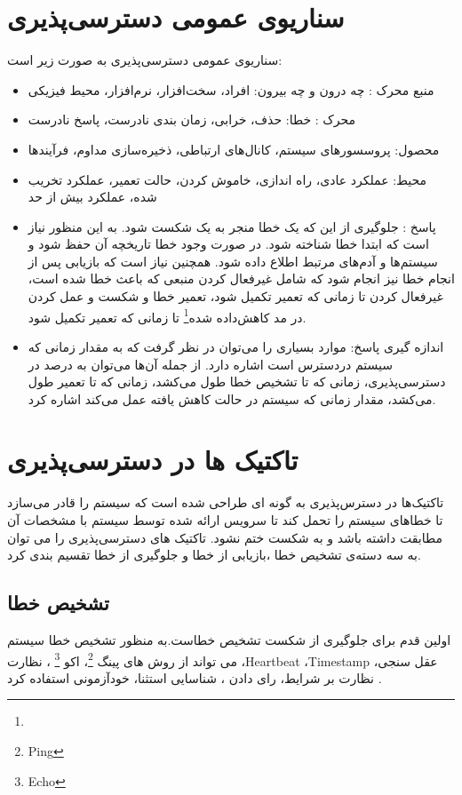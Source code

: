 \section{سناریوی عمومی دسترسی‌پذیری}
سناریو‌ی عمومی دسترسی‌پذیری به صورت زیر است:
\begin{itemize}
\item
منبع محرک : چه درون و چه بیرون: افراد، سخت‌افزار، نرم‌افزار، محیط فیزیکی 
\item
محرک : خطا: حذف، خرابی، زمان بندی نادرست، پاسخ نادرست
\item
محصول: پروسسورهای سیستم، کانال‌های ارتباطی، ذخیره‌سازی مداوم، فرآیند‌ها
\item
محیط: عملکرد عادی، راه اندازی، خاموش کردن، حالت تعمیر، عملکرد تخریب شده، عملکرد بیش از حد
\item
پاسخ : جلوگیری از این که یک خطا منجر به یک شکست شود. به این منظور نیاز است که ابتدا خطا شناخته شود. در صورت وجود خطا تاریخچه آن حفظ شود و سیستم‌ها و آدم‌های مرتبط اطلاع داده شود. همچنین نیاز است که بازیابی پس از انجام خطا نیز انجام شود که شامل غیرفعال کردن منبعی که باعث خطا شده است، غیرفعال کردن تا زمانی که تعمیر تکمیل شود، تعمیر خطا و شکست و عمل کردن در مد کاهش‌داده شده\footnote{} تا زمانی که تعمیر تکمیل شود.
\item
اندازه گیری پاسخ: موارد بسیاری را می‌توان در نظر گرفت که به مقدار زمانی که سیستم دردسترس است اشاره دارد. از جمله آن‌ها می‌توان به درصد در دسترسی‌پذیری، زمانی که تا تشخیص خطا طول می‌کشد، زمانی که تا تعمیر طول ‌می‌کشد، مقدار زمانی که سیستم در حالت کاهش یافته عمل می‌کند اشاره کرد. 
\end{itemize}

\section{تاکتیک ها در دسترسی‌پذیری}
تاکتیک‌ها در دسترس‌پذیری به گونه ای طراحی شده است که سیستم را قادر می‌سازد تا خطاهای سیستم را تحمل کند تا سرویس ارائه شده توسط سیستم با مشخصات آن مطابقت داشته باشد و به شکست ختم نشود. تاکتیک های دسترسی‌پذیری را می توان به سه دسته‌ی تشخیص خطا ،بازیابی از خطا و جلوگیری از خطا تقسیم بندی کرد.
\subsection{تشخیص خطا}
اولین قدم برای جلوگیری از شکست تشخیص خطاست.به منظور تشخیص خطا سیستم می تواند از روش های
پینگ \footnote{Ping}، اکو \footnote{Echo} ،
نظارت
،Heartbeat
،Timestamp
عقل سنجی،
نظارت بر شرایط،
رای دادن ،
شناسایی استثنا،
خودآزمونی 
استفاده کرد \cite{ataie2011improving} .
